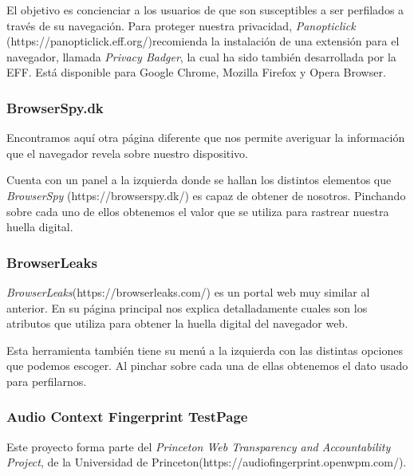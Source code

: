 El objetivo es concienciar a los usuarios de que son susceptibles a ser perfilados a través de su navegación. Para proteger nuestra privacidad, \textit{Panopticlick} (https://panopticlick.eff.org/)recomienda la instalación de una extensión para el navegador, llamada \textit{Privacy Badger}, la cual ha sido también desarrollada por la EFF. Está disponible para Google Chrome, Mozilla Firefox y Opera Browser. \par 

\subsubsection{BrowserSpy.dk}

Encontramos aquí otra página diferente que nos permite averiguar la información que el navegador revela sobre nuestro dispositivo. \par 

Cuenta con un panel a la izquierda donde se hallan los distintos elementos que \textit{BrowserSpy} (https://browserspy.dk/) es capaz de obtener de nosotros. Pinchando sobre cada uno de ellos obtenemos el valor que se utiliza para rastrear nuestra huella digital. \par 

\subsubsection{BrowserLeaks}

\textit{BrowserLeaks}(https://browserleaks.com/) es un portal web muy similar al anterior. En su página principal nos explica detalladamente cuales son los atributos que utiliza para obtener la huella digital del navegador web. \par 

Esta herramienta también tiene su menú a la izquierda con las distintas opciones que podemos escoger. Al pinchar sobre cada una de ellas obtenemos el dato usado para perfilarnos. \par 

\subsubsection{Audio Context Fingerprint TestPage}

Este proyecto forma parte del \textit{Princeton Web Transparency and Accountability Project}, de la Universidad de Princeton(https://audiofingerprint.openwpm.com/). \par 

